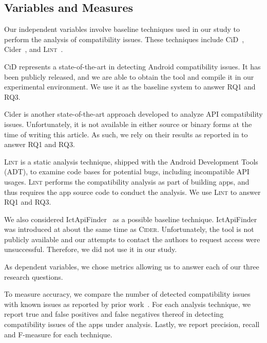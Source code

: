 \subsection{Variables and Measures}

Our independent variables involve baseline techniques used
in our study to perform the analysis of compatibility issues.
These techniques include {\sc CiD}~\cite{lili2018cid}, {\sc
Cider}~\cite{huang2018understanding}, and
\textsc{Lint}~\cite{linttips}.

\textsc{CiD} represents a state-of-the-art in detecting
Android compatibility issues. It has been publicly released,
and we are able to obtain the tool and compile it in our
experimental environment.  We use it as the baseline system
to answer RQ1 and RQ3.

{\sc Cider} is another state-of-the-art approach developed to analyze API compatibility issues. Unfortunately, it is not available in  either source or binary forms at the
time of writing this article.  As such, we rely on their results as reported in \cite{huang2018understanding} to answer RQ1 and RQ3.

\textsc{Lint} is a static analysis technique, shipped
with the Android Development Tools (ADT), to examine
code bases for potential bugs, including incompatible
API usages.  \textsc{Lint} performs the compatibility
analysis as part of building apps, and thus requires the app source code to conduct the analysis. We use \textsc{Lint} to answer RQ1 and RQ3.

We also considered {\sc
IctApiFinder}~\cite{he2018understanding} as a possible
baseline technique. {\sc IctApiFinder} was introduced
at about the same time as \textsc{Cider}.
Unfortunately, the tool is not publicly available and
our attempts to contact the authors to request access
were unsuccessful. Therefore, we did not use it in our
study.

 As dependent variables, we chose
metrics allowing us to answer each of our three research
questions.

To measure accuracy, we compare the number of detected compatibility issues with known issues as reported by prior work~\cite{huang2018understanding,lili2018cid}. For each analysis technique, we report true and false positives and false
negatives thereof in detecting compatibility issues of the apps under analysis. Lastly, we report precision, recall and F-measure for each technique.



